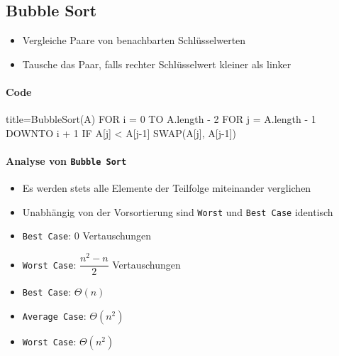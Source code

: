 \documentclass[
    ngerman,
    color=3b,
    dark_mode,
    load_common, %
    summary,
    boxarc,
]{rubos-tuda-template}
\begin{document}
\subsection{Bubble Sort}\label{BubbleSort}
\begin{idea}\mbox{}
    \begin{itemize}
        \item Vergleiche Paare von benachbarten Schlüsselwerten
        \item Tausche das Paar, falls rechter Schlüsselwert kleiner als linker
    \end{itemize}
\end{idea}

\paragraph{Code}\mbox{}
\begin{codeBlock}[autogobble]{title=BubbleSort(A)}
    FOR i = 0 TO A.length - 2
        FOR j = A.length - 1 DOWNTO i + 1
            IF A[j] < A[j-1]
                SWAP(A[j], A[j-1])
\end{codeBlock}

\paragraph{Analyse von \texttt{Bubble Sort}}
\begin{description}[leftmargin=5cm,itemsep=1em]
    \item [Anzahl der Vergleiche]
          \begin{itemize}
              \item Es werden stets alle Elemente der Teilfolge miteinander verglichen
              \item Unabhängig von der Vorsortierung sind \texttt{Worst} und \texttt{Best Case} identisch
          \end{itemize}

    \item [Anzahl der Vertauschungen]
          \begin{itemize}
              \item \texttt{Best Case}: 0 Vertauschungen
              \item \texttt{Worst Case}: $\dfrac{n^2-n}{2}$ Vertauschungen
          \end{itemize}

    \item [Komplexität]
          \begin{itemize}
              \item \texttt{Best Case}: $\Theta(n)$
              \item \texttt{Average Case}: $\Theta(n^2)$
              \item \texttt{Worst Case}: $\Theta(n^2)$
          \end{itemize}
\end{description}
\end{document}
